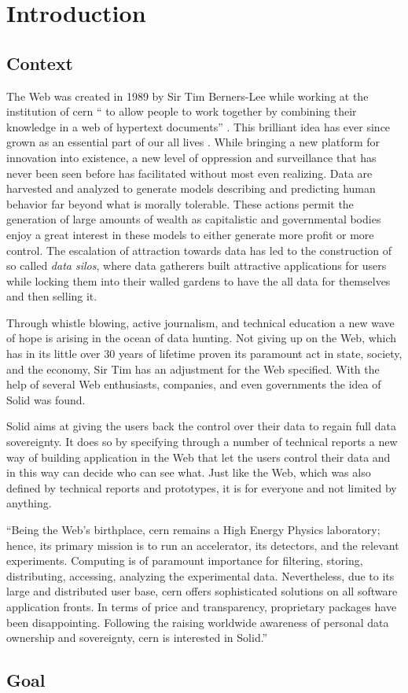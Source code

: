 \chapter{Introduction}
\section{Context}

The Web was created in 1989 by Sir Tim Berners-Lee while working at the institution of \gls{cern} “\textelp{} to allow people to work together by combining their knowledge in a web of hypertext documents” \cite{timbl-bio}. This brilliant idea has ever since grown as an essential part of our all lives \cite{cern-solid-investigation-spec}. While bringing a new platform for innovation into existence, a new level of oppression and surveillance that has never been seen before has facilitated without most even realizing. Data are harvested and analyzed to generate models describing and predicting human behavior far beyond what is morally tolerable. These actions permit the generation of large amounts of wealth as capitalistic and governmental bodies enjoy a great interest in these models to either generate more profit or more control. The escalation of attraction towards data has led to the construction of so called \textit{data silos}, where data gatherers built attractive applications for users while locking them into their walled gardens to have the all data for themselves and then selling it.

Through whistle blowing, active journalism, and technical education a new wave of hope is arising in the ocean of data hunting. Not giving up on the Web, which has in its little over 30 years of lifetime proven its paramount act in state, society, and the economy, Sir Tim has an adjustment for the Web specified. With the help of several Web enthusiasts, companies, and even governments the idea of Solid was found.

Solid aims at giving the users back the control over their data to regain full data sovereignty. It does so by specifying through a number of technical reports a new way of building application in the Web that let the users control their data and in this way can decide who can see what. Just like the Web, which was also defined by technical reports and prototypes, it is for everyone and not limited by anything. 

“Being the Web’s birthplace, \gls{cern} remains a High Energy Physics laboratory; hence, its primary mission is to run an accelerator, its detectors, and the relevant experiments. Computing is of paramount importance for filtering, storing, distributing, accessing, analyzing the experimental data. Nevertheless, due to its large and distributed user base, \gls{cern} offers sophisticated solutions on all software application fronts. In terms of price and transparency, proprietary packages have been disappointing. Following the raising worldwide awareness of personal data ownership and sovereignty, \gls{cern} is interested in Solid.” \cite{cern-solid-investigation-spec}

\section{Goal}
